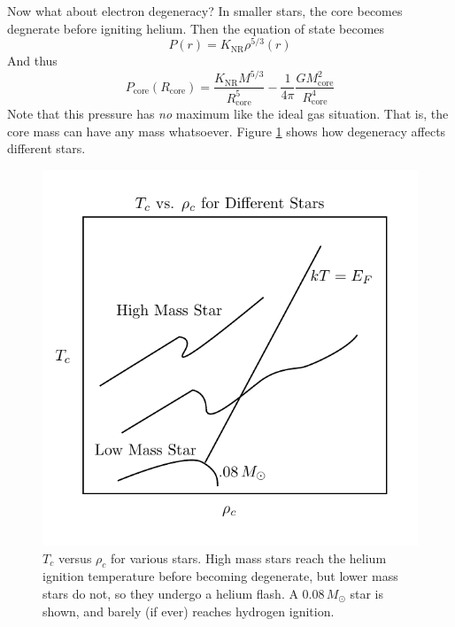 \documentclass[10pt]{article}
\numberwithin{equation}{section}
\newcommand{\n}{\noindent}
\newcommand{\figref}[1]{Figure \ref{#1}}
\begin{document}
    \n Now what about electron degeneracy? In smaller stars, the core
    becomes degnerate before igniting helium. Then the equation of
    state becomes
    \begin{equation}
      \label{eq:261}
      P(r)=K_{\mathrm{NR}}\rho^{5/3}(r)
    \end{equation}
    And thus
    \begin{equation}
      \label{eq:262}
      P_{\mathrm{core}}(R_{\mathrm{core}})=\frac{K_{\mathrm{NR}}M^{5/3}}{R_
{\mathrm{core}}^5}-\frac{1}{4\pi}\frac{GM_{\mathrm{core}}^2}{R_{\mathrm
{core}}^4}
    \end{equation}
    Note that this pressure has \emph{no} maximum like the ideal gas
    situation. That is, the core mass can have any mass
    whatsoever. \figref{fig:4} shows how degeneracy affects different
    stars.\\

    \begin{figure}[h!]
      \centering
      \includegraphics{TcRhoc.pdf}
      \caption{$T_c$ versus $\rho_c$ for various stars. High mass stars 
reach the helium ignition temperature before becoming degenerate, but lower 
mass stars do not, so they undergo a helium flash. A $0.08\,M_\odot$ star 
is shown, and barely (if ever) reaches hydrogen ignition.}
      \label{fig:4}
    \end{figure}
    
\end{document}
